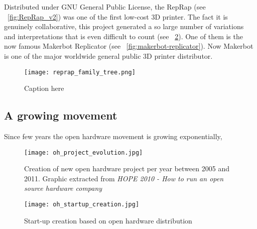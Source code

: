 \begin{figure}[]
\centering
    \hfil
    \caption{}
    \label{fig:RepRap_project}
\end{figure}


Distributed under GNU General Public License, the RepRap (see \figurename~\ref{fig:RepRap_v2}) was one of the first low-cost 3D printer. The fact it is genuinely collaborative, this project generated a so large number of variations and interpretations that is even difficult to count (see \figurename~\ref{fig:RepRap_family_tree}). One of them is the now famous Makerbot Replicator (see \figurename~\ref{fig:makerbot-replicator}). Now Makerbot is one of the major worldwide general public 3D printer distributor.

\begin{figure}[]
    \begin{center}
        \texttt{[image: reprap\_family\_tree.png]}
    \end{center}
    \caption{Caption here}
    \label{fig:RepRap_family_tree}
\end{figure}



\subsection{A growing movement} %

Since few years the open hardware movement is growing exponentially,

\begin{figure}[]
    \begin{center}
        \texttt{[image: oh\_project\_evolution.jpg]}
    \end{center}
    \caption{Creation of new open hardware project per year between 2005 and 2011.
    Graphic extracted from \emph{HOPE 2010 - How to run an open source hardware company}}
    \label{fig:oh_project_evolution}
\end{figure}


\begin{figure}[]
    \begin{center}
        \texttt{[image: oh\_startup\_creation.jpg]}
    \end{center}
    \caption{Start-up creation based on open hardware distribution}
    \label{fig:oh_startup_creation}
\end{figure}

